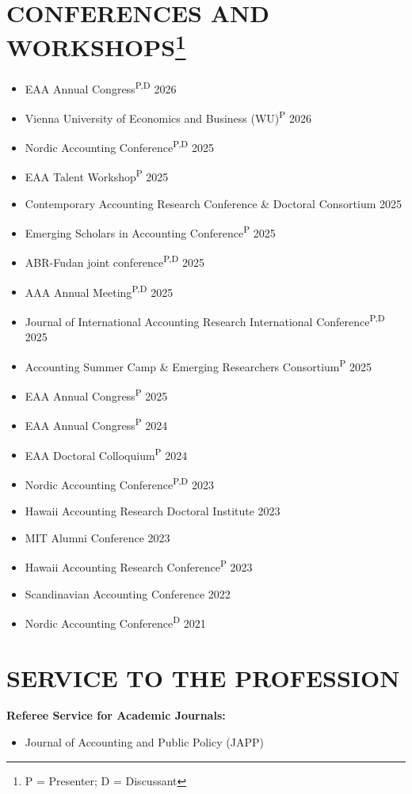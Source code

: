 \documentclass[letterpaper,9pt]{extarticle}
\begin{document}
\section*{CONFERENCES AND WORKSHOPS\footnote{P = Presenter; D = Discussant}}

\begin{itemize}
    \item EAA Annual Congress\textsuperscript{P,D} \hfill 2026
    \item Vienna University of Economics and Business (WU)\textsuperscript{P}  \hfill 2026
    \item Nordic Accounting Conference\textsuperscript{P,D}  \hfill 2025
    \item EAA Talent Workshop\textsuperscript{P} \hfill 2025
    \item Contemporary Accounting Research Conference \& Doctoral Consortium  \hfill 2025
    \item Emerging Scholars in Accounting Conference\textsuperscript{P} \hfill 2025
    \item ABR-Fudan joint conference\textsuperscript{P,D} \hfill 2025
    \item AAA Annual Meeting\textsuperscript{P,D} \hfill 2025
    \item Journal of International Accounting Research International Conference\textsuperscript{P,D} \hfill 2025
    \item Accounting Summer Camp \& Emerging Researchers Consortium\textsuperscript{P} \hfill 2025
    \item EAA Annual Congress\textsuperscript{P} \hfill 2025
    \item EAA Annual Congress\textsuperscript{P} \hfill 2024
    \item EAA Doctoral Colloquium\textsuperscript{P} \hfill 2024
    \item Nordic Accounting Conference\textsuperscript{P,D} \hfill 2023
    \item Hawaii Accounting Research Doctoral Institute \hfill 2023
    \item MIT Alumni Conference \hfill 2023
    \item Hawaii Accounting Research Conference\textsuperscript{P} \hfill 2023
    \item Scandinavian Accounting Conference \hfill 2022
    \item Nordic Accounting Conference\textsuperscript{D} \hfill 2021
\end{itemize}

\section*{SERVICE TO THE PROFESSION}
\noindent \textbf{Referee Service for Academic Journals:}
\begin{itemize}
    \item Journal of Accounting and Public Policy (JAPP) 
\end{itemize}
\end{document}
